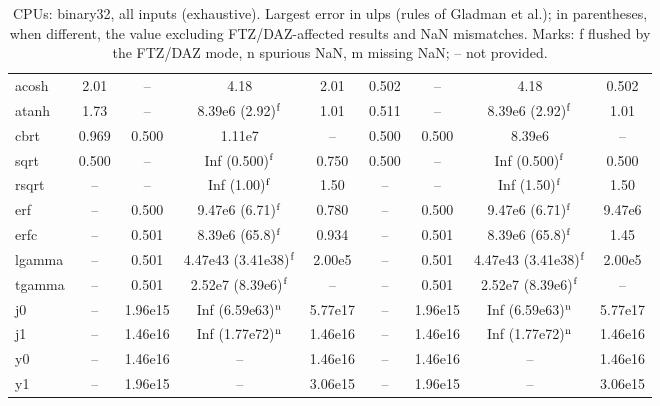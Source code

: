 \begin{table}
\begin{small}
\begin{tabular}{|l|cccc|cccc|}
acosh & 2.01 & -- & 4.18 & 2.01 & 0.502 & -- & 4.18 & 0.502 \\
atanh & 1.73 & -- & 8.39e6 (2.92)$^{\rm f}$ & 1.01 & 0.511 & -- & 8.39e6 (2.92)$^{\rm f}$ & 1.01 \\
cbrt & 0.969 & 0.500 & 1.11e7 & -- & 0.500 & 0.500 & 8.39e6 & -- \\
sqrt & 0.500 & -- & Inf (0.500)$^{\rm f}$ & 0.750 & 0.500 & -- & Inf (0.500)$^{\rm f}$ & 0.500 \\
rsqrt & -- & -- & Inf (1.00)$^{\rm f}$ & 1.50 & -- & -- & Inf (1.50)$^{\rm f}$ & 1.50 \\
erf & -- & 0.500 & 9.47e6 (6.71)$^{\rm f}$ & 0.780 & -- & 0.500 & 9.47e6 (6.71)$^{\rm f}$ & 9.47e6 \\
erfc & -- & 0.501 & 8.39e6 (65.8)$^{\rm f}$ & 0.934 & -- & 0.501 & 8.39e6 (65.8)$^{\rm f}$ & 1.45 \\
lgamma & -- & 0.501 & 4.47e43 (3.41e38)$^{\rm f}$ & 2.00e5 & -- & 0.501 & 4.47e43 (3.41e38)$^{\rm f}$ & 2.00e5 \\
tgamma & -- & 0.501 & 2.52e7 (8.39e6)$^{\rm f}$ & -- & -- & 0.501 & 2.52e7 (8.39e6)$^{\rm f}$ & -- \\
j0 & -- & 1.96e15 & Inf (6.59e63)$^{\rm n}$ & 5.77e17 & -- & 1.96e15 & Inf (6.59e63)$^{\rm n}$ & 5.77e17 \\
j1 & -- & 1.46e16 & Inf (1.77e72)$^{\rm n}$ & 1.46e16 & -- & 1.46e16 & Inf (1.77e72)$^{\rm n}$ & 1.46e16 \\
y0 & -- & 1.46e16 & -- & 1.46e16 & -- & 1.46e16 & -- & 1.46e16 \\
y1 & -- & 1.96e15 & -- & 3.06e15 & -- & 1.96e15 & -- & 3.06e15 \\
\hline
\end{tabular}
\end{small}
\caption{CPUs: binary32, all inputs (exhaustive). Largest error in ulps (rules of Gladman et al.); in parentheses, when different, the value excluding FTZ/DAZ-affected results and NaN mismatches. Marks: f flushed by the FTZ/DAZ mode, n spurious NaN, m missing NaN; -- not provided.}
\label{tab:b32cpu}
\end{table}
